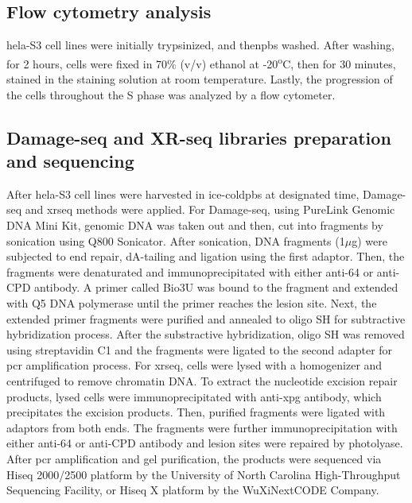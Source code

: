 \subsection{Flow cytometry analysis}
\gls{hela}-S3 cell lines were initially trypsinized, and then\gls{pbs} washed. After washing, for 2 hours, cells were fixed in 70\% (v/v) ethanol at -20\textsuperscript{o}C, then for 30 minutes, stained in the staining solution at room temperature. Lastly, the progression of the cells throughout the S phase was analyzed by a flow cytometer.

\subsection{Damage-seq and  XR-seq libraries preparation and sequencing}
After \gls{hela}-S3 cell lines were harvested in ice-cold\gls{pbs} at designated time, Damage-seq and \gls{xrseq} methods were applied. For Damage-seq, using PureLink Genomic DNA Mini Kit, genomic DNA was taken out and then, cut into fragments by sonication using Q800 Sonicator. After sonication, DNA fragments (1$\mu$g) were subjected to end repair, dA-tailing and ligation using the first adaptor. Then, the fragments were denaturated and immunoprecipitated with either anti-\gls{64} or anti-\gls{CPD} antibody. A primer called Bio3U was bound to the fragment and extended with Q5 DNA polymerase until the primer reaches the lesion site. Next, the extended primer fragments were purified and annealed to oligo SH for subtractive hybridization process. After the substractive hybridization, oligo SH was removed using streptavidin C1 and the fragments were ligated to the second adapter for \gls{pcr} amplification process. For \gls{xrseq}, cells were lysed with a homogenizer and centrifuged to remove chromatin DNA. To extract the nucleotide excision repair products, lysed cells were immunoprecipitated with anti-\gls{xpg} antibody, which precipitates the excision products. Then, purified fragments were ligated with adaptors from both ends. The fragments were further immunoprecipitation with either anti-\gls{64} or anti-\gls{CPD} antibody and lesion sites were repaired by photolyase. After \gls{pcr} amplification and gel purification, the products were sequenced via Hiseq 2000/2500 platform by the University of North Carolina High-Throughput Sequencing Facility, or Hiseq X platform by the WuXiNextCODE Company.  

